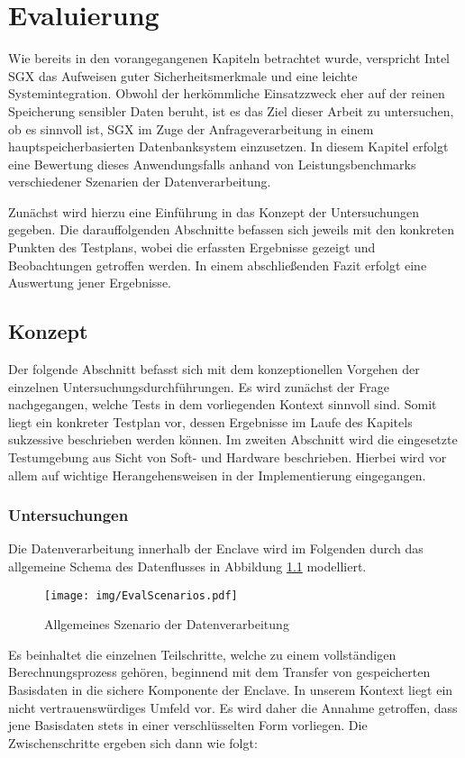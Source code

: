 
\chapter{Evaluierung}

Wie bereits in den vorangegangenen Kapiteln betrachtet wurde, verspricht Intel \ac{SGX} das Aufweisen guter Sicherheitsmerkmale und eine leichte Systemintegration. Obwohl der herkömmliche Einsatzzweck eher auf der reinen Speicherung sensibler Daten beruht, ist es das Ziel dieser Arbeit zu untersuchen, ob es sinnvoll ist, \ac{SGX} im Zuge der Anfrageverarbeitung in einem hauptspeicherbasierten Datenbanksystem einzusetzen. In diesem Kapitel erfolgt eine Bewertung dieses Anwendungsfalls anhand von Leistungsbenchmarks verschiedener Szenarien der Datenverarbeitung.

Zunächst wird hierzu eine Einführung in das Konzept der Untersuchungen gegeben. Die darauffolgenden Abschnitte befassen sich jeweils mit den konkreten Punkten des Testplans, wobei die erfassten Ergebnisse gezeigt und Beobachtungen getroffen werden. In einem abschließenden Fazit erfolgt eine Auswertung jener Ergebnisse.

\section{Konzept}

Der folgende Abschnitt befasst sich mit dem konzeptionellen Vorgehen der einzelnen Untersuchungsdurchführungen. Es wird zunächst der Frage nachgegangen, welche Tests in dem vorliegenden Kontext sinnvoll sind. Somit liegt ein konkreter Testplan vor, dessen Ergebnisse im Laufe des Kapitels sukzessive beschrieben werden können. Im zweiten Abschnitt wird die eingesetzte Testumgebung aus Sicht von Soft- und Hardware beschrieben. Hierbei wird vor allem auf wichtige Herangehensweisen in der Implementierung eingegangen.

\subsection{Untersuchungen}

Die Datenverarbeitung innerhalb der Enclave wird im Folgenden durch das allgemeine Schema des Datenflusses in Abbildung \ref{fig:scenarios} modelliert.
\begin{figure}[h]
	\texttt{[image: img/EvalScenarios.pdf]}
	\centering
	\caption{Allgemeines Szenario der Datenverarbeitung}
	\label{fig:scenarios}
\end{figure} 
Es beinhaltet die einzelnen Teilschritte, welche zu einem vollständigen Berechnungsprozess gehören, beginnend mit dem Transfer von gespeicherten Basisdaten in die sichere Komponente der Enclave. In unserem Kontext liegt ein nicht vertrauenswürdiges Umfeld vor. Es wird daher die Annahme getroffen, dass jene Basisdaten stets in einer verschlüsselten Form vorliegen. Die Zwischenschritte ergeben sich dann wie folgt:


